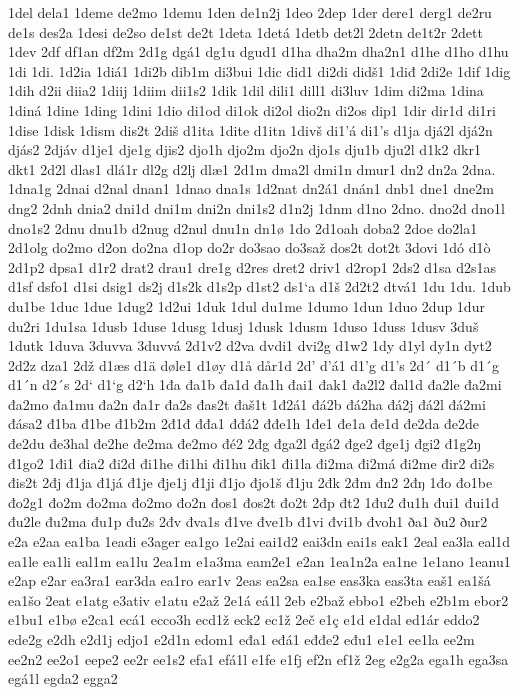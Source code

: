 1del
dela1
1deme
de2mo
1demu
1den
de1n2j
1deo
2dep
1der
dere1
derg1
de2ru
de1s
des2a
1desi
de2so
de1st
de2t
1deta
1detá
1detb
det2l
2detn
de1t2r
2dett
1dev
2df
df1an
df2m
2d1g
dgá1
dg1u
dgud1
d1ha
dha2m
dha2n1
d1he
d1ho
d1hu
1di
1di.
1d2ia
1diá1
1di2b
dib1m
di3bui
1dic
did1
di2di
didš1
1diđ
2di2e
1dif
1dig
1dih
d2ii
diia2
1diij
1diim
dii1s2
1dik
1dil
dili1
dill1
di3luv
1dim
di2ma
1dina
1diná
1dine
1ding
1dini
1dio
di1od
di1ok
di2ol
dio2n
di2os
dip1
1dir
dir1d
di1ri
1dise
1disk
1dism
dis2t
2diš
d1ita
1dite
d1itn
1divš
di1'á
di1's
d1ja
djá2l
djá2n
djás2
2djáv
d1je1
dje1g
djis2
djo1h
djo2m
djo2n
djo1s
dju1b
dju2l
d1k2
dkr1
dkt1
2d2l
dlas1
dlá1r
dl2g
d2lj
dlæ1
2d1m
dma2l
dmi1n
dmur1
dn2
dn2a
2dna.
1dna1g
2dnai
d2nal
dnan1
1dnao
dna1s
1d2nat
dn2á1
dnán1
dnb1
dne1
dne2m
dng2
2dnh
dnia2
dni1d
dni1m
dni2n
dni1s2
d1n2j
1dnm
d1no
2dno.
dno2d
dno1l
dno1s2
2dnu
dnu1b
d2nug
d2nul
dnu1n
dn1ø
1do
2d1oah
doba2
2doe
do2la1
2d1olg
do2mo
d2on
do2na
d1op
do2r
do3sao
do3saž
dos2t
dot2t
3dovi
1dó
d1ò
2d1p2
dpsa1
d1r2
drat2
drau1
dre1g
d2res
dret2
driv1
d2rop1
2ds2
d1sa
d2s1as
d1sf
dsfo1
d1si
dsig1
ds2j
d1s2k
d1s2p
d1st2
ds1`a
d1š
2d2t2
dtvá1
1du
1du.
1dub
du1be
1duc
1due
1dug2
1d2ui
1duk
1dul
du1me
1dumo
1dun
1duo
2dup
1dur
du2ri
1du1sa
1dusb
1duse
1dusg
1dusj
1dusk
1dusm
1duso
1duss
1dusv
3duš
1dutk
1duva
3duvva
3duvvá
2d1v2
d2va
dvdi1
dvi2g
d1w2
1dy
d1yl
dy1n
dyt2
2d2z
dza1
2dž
d1æs
d1ä
døle1
d1øy
d1å
dår1d
2d'
d'á1
d1'g
d1's
2d´
d1´b
d1´g
d1´n
d2´s
2d`
d1`g
d2`h
1đa
đa1b
đa1d
đa1h
đai1
đak1
đa2l2
đal1d
đa2le
đa2mi
đa2mo
đa1mu
đa2n
đa1r
đa2s
đas2t
đaš1t
1đ2á1
đá2b
đá2ha
đá2j
đá2l
đá2mi
đása2
đ1ba
đ1be
đ1b2m
2đ1đ
đđa1
đđá2
đđe1h
1đe1
đe1a
đe1d
đe2da
đe2de
đe2du
đe3hal
đe2he
đe2ma
đe2mo
đé2
2đg
đga2l
đgá2
đge2
đge1j
đgi2
đ1g2ŋ
đ1go2
1đi1
đia2
đi2d
đi1he
đi1hi
đi1hu
đik1
đi1la
đi2ma
đi2má
đi2me
đir2
đi2s
đis2t
2đj
đ1ja
đ1já
đ1je
đje1j
đ1ji
đ1jo
đjo1š
đ1ju
2đk
2đm
đn2
2đŋ
1đo
đo1be
đo2g1
đo2m
đo2ma
đo2mo
đo2n
đos1
đos2t
đo2t
2đp
đt2
1đu2
đu1h
đui1
đui1d
đu2le
đu2ma
đu1p
đu2s
2đv
đva1s
đ1ve
đve1b
đ1vi
đvi1b
đvoh1
ða1
ðu2
ður2
e2a
e2aa
ea1ba
1eadi
e3ager
ea1go
1e2ai
eai1d2
eai3dn
eai1s
eak1
2eal
ea3la
eal1d
ea1le
ea1li
eal1m
ea1lu
2ea1m
e1a3ma
eam2e1
e2an
1ea1n2a
ea1ne
1e1ano
1eanu1
e2ap
e2ar
ea3ra1
ear3da
ea1ro
ear1v
2eas
ea2sa
ea1se
eas3ka
eas3ta
eaš1
ea1šá
ea1šo
2eat
e1atg
e3ativ
e1atu
e2až
2e1á
eá1l
2eb
e2baž
ebbo1
e2beh
e2b1m
ebor2
e1bu1
e1bø
e2ca1
ecá1
ecco3h
ecd1ž
eck2
ec1ž
2eč
e1ç
e1d
e1dal
ed1ár
eddo2
ede2g
e2dh
e2d1j
edjo1
e2d1n
edom1
eđa1
eđá1
eđđe2
eđu1
e1e1
ee1la
ee2m
ee2n2
ee2o1
eepe2
ee2r
ee1s2
efa1
efá1l
e1fe
e1fj
ef2n
ef1ž
2eg
e2g2a
ega1h
ega3sa
egá1l
egda2
egga2
